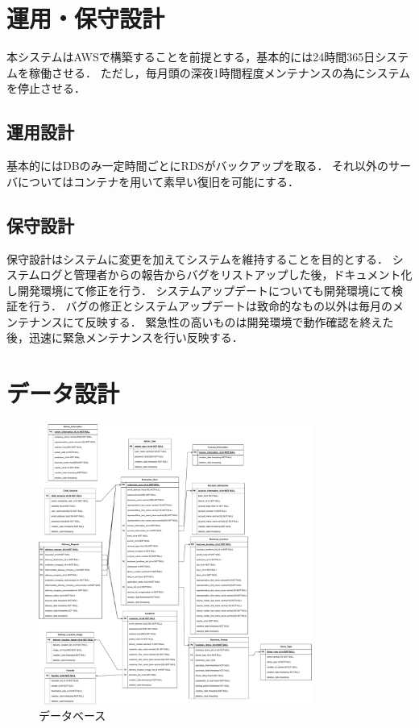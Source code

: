 \documentclass[a4paper, titlepage]{jsarticle}
\begin{document}
\section{運用・保守設計}
本システムはAWSで構築することを前提とする，基本的には24時間365日システムを稼働させる．
ただし，毎月頭の深夜1時間程度メンテナンスの為にシステムを停止させる．
\subsection{運用設計}
基本的にはDBのみ一定時間ごとにRDSがバックアップを取る．
それ以外のサーバについてはコンテナを用いて素早い復旧を可能にする．

\subsection{保守設計}
保守設計はシステムに変更を加えてシステムを維持することを目的とする．
システムログと管理者からの報告からバグをリストアップした後，ドキュメント化し開発環境にて修正を行う．
システムアップデートについても開発環境にて検証を行う．
バグの修正とシステムアップデートは致命的なもの以外は毎月のメンテナンスにて反映する．
緊急性の高いものは開発環境で動作確認を終えた後，迅速に緊急メンテナンスを行い反映する．
\section{データ設計}
\begin{figure}[H]
  \centering
  \includegraphics[width=0.8\textwidth]{other/database.pdf}
  \caption{データベース}
  \label{fig:driver}
\end{figure}
\end{document}
